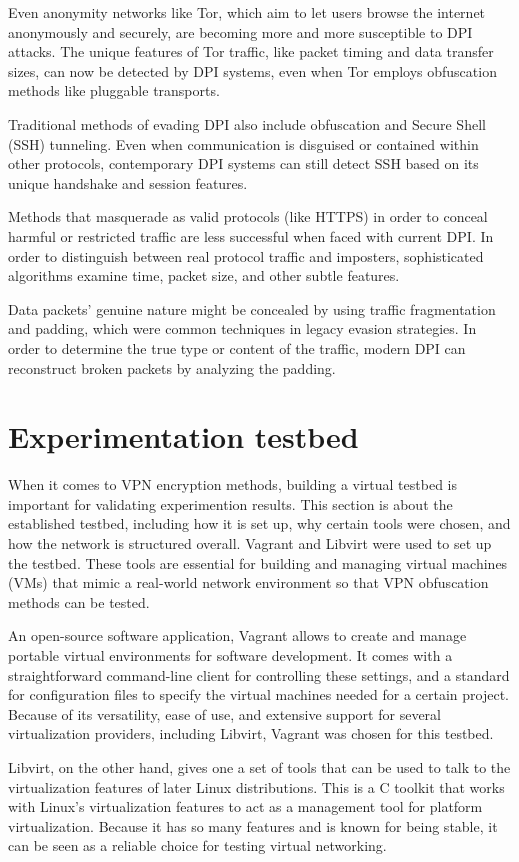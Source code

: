 \documentclass[12pt, fleqn, a4paper]{article}
\begin{document}
Even anonymity networks like Tor, which aim to let users browse the internet anonymously and securely, are becoming more and more susceptible to DPI attacks. The unique features of Tor traffic, like packet timing and data transfer sizes, can now be detected by DPI systems, even when Tor employs obfuscation methods like pluggable transports.

Traditional methods of evading DPI also include obfuscation and Secure Shell (SSH) tunneling. Even when communication is disguised or contained within other protocols, contemporary DPI systems can still detect SSH based on its unique handshake and session features. \citep{sshtunneling}

Methods that masquerade as valid protocols (like HTTPS) in order to conceal harmful or restricted traffic are less successful when faced with current DPI. In order to distinguish between real protocol traffic and imposters, sophisticated algorithms examine time, packet size, and other subtle features. \citep{dpisslinspect}

Data packets' genuine nature might be concealed by using traffic fragmentation and padding, which were common techniques in legacy evasion strategies. In order to determine the true type or content of the traffic, modern DPI can reconstruct broken packets by analyzing the padding.
\section{Experimentation testbed}
When it comes to VPN encryption methods, building a virtual testbed is important for validating experimention results. This section is about the established testbed, including how it is set up, why certain tools were chosen, and how the network is structured overall. Vagrant and Libvirt were used to set up the testbed. These tools are essential for building and managing virtual machines (VMs) that mimic a real-world network environment so that VPN obfuscation methods can be tested.

An open-source software application, Vagrant allows to create and manage portable virtual environments for software development. It comes with a straightforward command-line client for controlling these settings, and a standard for configuration files to specify the virtual machines needed for a certain project. Because of its versatility, ease of use, and extensive support for several virtualization providers, including Libvirt, Vagrant was chosen for this testbed.

Libvirt, on the other hand, gives one a set of tools that can be used to talk to the virtualization features of later Linux distributions. This is a C toolkit that works with Linux's virtualization features to act as a management tool for platform virtualization. Because it has so many features and is known for being stable, it can be seen as a reliable choice for testing virtual networking.
\end{document}
